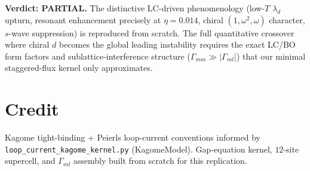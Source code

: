\documentclass[11pt]{article}
\begin{document}
\medskip
\noindent\textbf{Verdict: PARTIAL.} The distinctive LC-driven phenomenology
(low-$T$ $\lambda_d$ upturn, resonant enhancement precisely at $\eta=0.014$,
chiral $(1,\omega^2,\omega)$ character, $s$-wave suppression) is reproduced
from scratch. The full quantitative crossover where chiral $d$ becomes the
global leading instability requires the exact LC/BO form factors and
sublattice-interference structure ($\Gamma_{mm}\gg|\Gamma_{ml}|$) that our
minimal staggered-flux kernel only approximates.

\section*{Credit}
Kagome tight-binding + Peierls loop-current conventions informed by
\texttt{loop\_current\_kagome\_kernel.py} (KagomeModel). Gap-equation kernel,
$12$-site supercell, and $\Gamma_{ml}$ assembly built from scratch for this
replication.
\end{document}
